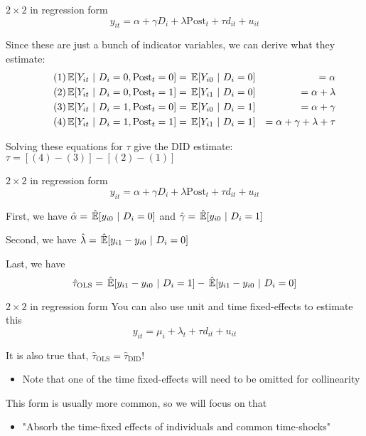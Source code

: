 \documentclass[aspectratio=169,t,11pt,table]{beamer}
\begin{document}
\begin{frame}{$2 \times 2$ in regression form}
  \vspace*{-\bigskipamount}
  $$
    y_{it} = \alpha + \gamma D_i + \lambda \text{Post}_t + \tau d_{it} + u_{it}
  $$
  
  \bigskip
  Since these are just a bunch of indicator variables, we can derive what they estimate:
  \begin{align*}
    \tag{1}
    \expec{Y_{it}}{D_i = 0, \text{Post}_t = 0} 
    &= \expec{Y_{i0}}{D_i = 0} 
    &= \alpha \\ 
    \tag{2}
    \expec{Y_{it}}{D_i = 0, \text{Post}_t = 1} 
    &= \expec{Y_{i1}}{D_i = 0} 
    &= \alpha + \lambda \\ 
    \tag{3}
    \expec{Y_{it}}{D_i = 1, \text{Post}_t = 0} 
    &= \expec{Y_{i0}}{D_i = 1} 
    &= \alpha + \gamma \\ 
    \tag{4}
    \expec{Y_{it}}{D_i = 1, \text{Post}_t = 1} 
    &= \expec{Y_{i1}}{D_i = 1} 
    &= \alpha + \gamma + \lambda + \tau 
  \end{align*}

  Solving these equations for $\tau$ give the DID estimate: $\tau = \left[ (4) - (3) \right] - \left[ (2) - (1) \right]$
\end{frame}


\begin{frame}{$2 \times 2$ in regression form}
  \vspace*{-\bigskipamount}
  $$
    y_{it} = \alpha + \gamma D_i + \lambda \text{Post}_t + \tau d_{it} + u_{it}
  $$
  
  \bigskip
  First, we have $\hat{\alpha} = \expechat{y_{i0}}{D_i = 0}$ and $\hat{\gamma} = \expechat{y_{i0}}{D_i = 1}$

  \bigskip
  Second, we have $\hat{\lambda} = \expechat{y_{i1} - y_{i0}}{D_i = 0}$ 

  \bigskip
  Last, we have 
  $$
    \hat{\tau}_{\text{OLS}} = \expechat{y_{i1} - y_{i0}}{D_i = 1} - \expechat{y_{i1} - y_{i0}}{D_i = 0}
  $$
\end{frame}

\begin{frame}{$2 \times 2$ in regression form}
  You can also use unit and time fixed-effects to estimate this
  $$
    y_{it} = \mu_i + \lambda_t + \tau d_{it} + u_{it}
  $$
  
  \bigskip
  It is also true that, $\hat{\tau}_{\text{OLS}} = \hat{\tau}_{\text{DID}}$!
  \begin{itemize}
    \item Note that one of the time fixed-effects will need to be omitted for collinearity
  \end{itemize}

  \bigskip
  This form is usually more common, so we will focus on that
  \begin{itemize}
    \item "Absorb the time-fixed effects of individuals and common time-shocks"
  \end{itemize}
\end{frame}
\end{document}
